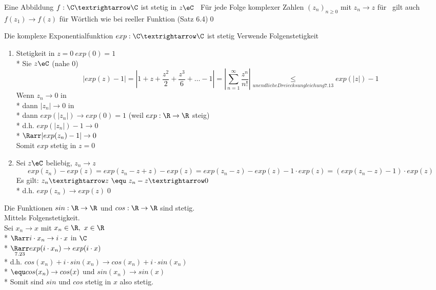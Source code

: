 Eine Abbildung $f:\C→\C$ ist stetig in $z\eC$ \equ\ Für jede Folge komplexer Zahlen $(z_n)_{n\geq 0}$ mit $z_n→z$ für \nif\ gilt auch $f(z_1)→f(z)$ für \nif
\bew
Wörtlich wie bei reeller Funktion (Satz 6.4)\qed

Die komplexe Exponentialfunktion $exp:\C→\C$ ist stetig
\bew
Verwende Folgenstetigkeit
\begin{enumerate}
\item{Stetigkeit in $z=0\ exp (0)=1$\\*
Sie $z\eC$ (nahe 0)
$$\left|exp(z)-1\right|=\left|1+z+\frac{z^2}{2}+\frac{z^3}{6}+…-1\right|=\left|\sum_{n=1}^{∞}\frac{z^n}{n!}\right|\underset{unendliche Dreiecksungleichung 7.13}{\leq}exp(|z|)-1$$
Wenn $z_n→0$ in \C\\*
dann $|z_n|→0$ in \R\\*
dann $exp(|z_n|) \to exp(0) = 1$ (weil $exp: \R \to \R$ steig)\\*
d.h. $exp(|z_n|) -1 \to 0$\\*
$\Rarr|exp(z_n) - 1| \to 0$\\
Somit $exp$ stetig in $z = 0$ }
\item{Sei $z\eC$ beliebig, $z_n→z$
$$exp(z_n)-exp(z)=exp(z_n-z+z)-exp(z)=exp(z_n-z)-exp(z)-1·exp(z)=(exp(z_n-z)-1)·exp(z)$$
Es gilt: $z_n→z\ \equ\ z_n-z→0$\\*
d.h. $exp(z_n)→exp(z)$\qed}
\end{enumerate}

	Die Funktionen $sin: \R \to \R$ und $cos: \R \to \R$ sind stetig.\\
\bew
Mittels Folgenstetigkeit.\\
Sei $x_n \to x$ mit $x_n \in \R,\ x \in \R$\\*
$\Rarr i \cdot x_n \to i \cdot x$ in $\C$\\*
$\underset{7.23}{\Rarr} exp(i \cdot x_n) \to exp(i \cdot x)$\\*
d.h. $cos(x_n) + i \cdot sin(x_n) \to cos(x_n) + i \cdot sin(x_n)$\\*
$\equ cos(x_n) \to cos(x)$ und $sin(x_n) \to sin(x)$\\*
Somit sind $sin$ und $cos$ stetig in $x$ also stetig.